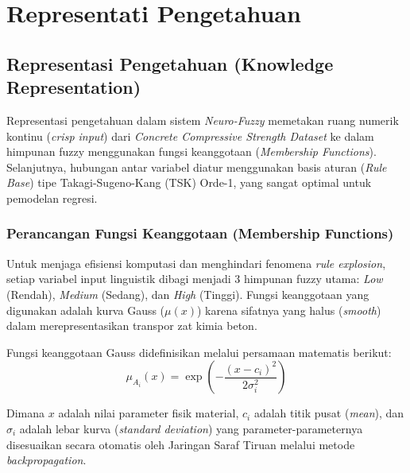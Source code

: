 \section{Representati Pengetahuan}
\subsection{Representasi Pengetahuan (Knowledge Representation)}
Representasi pengetahuan dalam sistem \textit{Neuro-Fuzzy} memetakan ru\-ang numerik kontinu (\textit{crisp input}) dari \textit{Concrete Compressive Strength Da\-ta\-set} ke dalam himpunan fuzzy menggunakan fungsi keanggotaan (\textit{Membership Functions}). 
Selanjutnya, hubungan antar variabel diatur menggunakan basis aturan (\textit{Rule Base}) tipe Takagi-Sugeno-Kang (TSK) Orde-1, yang sangat optimal untuk pemodelan regresi.

\subsubsection{Perancangan Fungsi Keanggotaan (Membership Functions)}
Untuk menjaga efisiensi komputasi dan menghindari fenomena \textit{ru\-le ex\-plo\-sion}, setiap variabel input linguistik dibagi menjadi 3 himpunan fuzzy utama: \textit{Low} (Rendah), \textit{Medium} (Sedang), dan \textit{High} (Tinggi). 
Fungsi keanggotaan yang digunakan adalah kurva Gauss ($\mu(x)$) karena sifatnya yang halus (\textit{smooth}) dalam merepresentasikan transpor zat kimia beton.

Fungsi keanggotaan Gauss didefinisikan melalui persamaan matematis berikut:
\begin{equation}
\mu_{A_i}(x) = \exp\left( -\frac{(x - c_i)^2}{2\sigma_i^2} \right)
\end{equation}

Dimana $x$ adalah nilai parameter fisik material, $c_i$ adalah titik pusat (\textit{mean}), dan $\sigma_i$ adalah lebar kurva (\textit{standard deviation}) yang parameter-parameter\-nya disesuaikan secara otomatis oleh Jaringan Saraf Tiruan me\-lalui metode \textit{backpropagation}.

